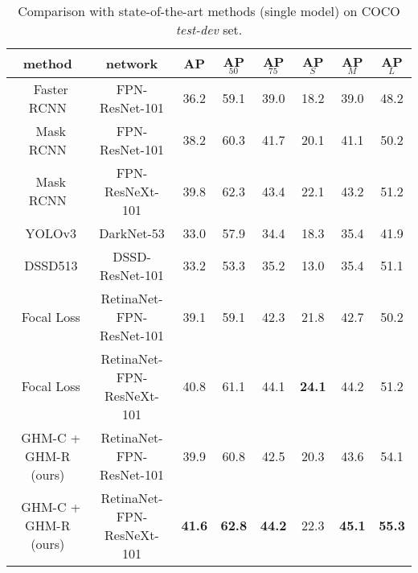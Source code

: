 \documentclass[letterpaper]{article} \usepackage{aaai19}  \usepackage{times}  \usepackage{helvet}  \usepackage{courier}  \usepackage{url}  \usepackage{graphicx}  \usepackage{amsmath,amssymb}
\begin{document}
\begin{table*}[t]
\begin{tabular}{| c | c | c c c | c c c|}
\hline
 method & network
 & AP & AP$_{50}$ & AP$_{75}$
 & AP$_S$ & AP$_M$ &  AP$_L$\\ [.1em]
\hline
 ~Faster RCNN \cite{faster} & FPN-ResNet-101
  & 36.2 & 59.1 & 39.0 & 18.2 & 39.0 & 48.2\\
 ~Mask RCNN \cite{mask} & FPN-ResNet-101
  & 38.2 & 60.3 & 41.7 & 20.1 & 41.1 & 50.2\\
 ~Mask RCNN \cite{mask} & FPN-ResNeXt-101
  & 39.8 & 62.3 & 43.4 & 22.1 & 43.2 & 51.2\\
\hline
 ~YOLOv3 \cite{yolov3} & DarkNet-53 
  & 33.0 & 57.9 & 34.4 & 18.3 & 35.4 & 41.9 \\
 ~DSSD513 \cite{dssd} & DSSD-ResNet-101
  & 33.2 & 53.3 & 35.2 & 13.0 & 35.4 & 51.1 \\
 ~Focal Loss \cite{focal} & RetinaNet-FPN-ResNet-101
  & 39.1 & 59.1 & 42.3 & 21.8 & 42.7 & 50.2 \\
 ~Focal Loss \cite{focal} & RetinaNet-FPN-ResNeXt-101
  & 40.8 & 61.1 & 44.1 & \textbf{24.1} & 44.2 & 51.2 \\
\hline
 ~GHM-C + GHM-R (ours) & RetinaNet-FPN-ResNet-101
  & 39.9 & 60.8 & 42.5 & 20.3 & 43.6 & 54.1 \\
 ~GHM-C + GHM-R (ours) & RetinaNet-FPN-ResNeXt-101
  & \textbf{41.6} & \textbf{62.8} & \textbf{44.2} & 22.3 & \textbf{45.1} & \textbf{55.3} \\
\hline
\end{tabular}
\caption{Comparison with state-of-the-art methods (single model) on COCO \textit{test-dev} set.}
\label{tab:main}
\end{table*}
\end{document}

